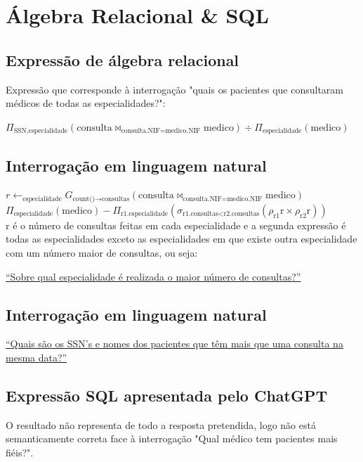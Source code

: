 \documentclass{article}
\begin{document}
\section{Álgebra Relacional \& SQL}

\subsection{Expressão de álgebra relacional}
Expressão que corresponde à interrogação "quais os pacientes que
consultaram médicos de todas as especialidades?":

\ul{$\Pi_{\text{SSN,especialidade}}(\text{consulta}\bowtie_{\text{consulta.NIF=medico.NIF}}\text{medico})\div\Pi_{\text{especialidade}}(\text{medico})$}

\subsection{Interrogação em linguagem natural}

\noindent $r\xleftarrow{}_{\text{especialidade}}G_{\text{count()}\xrightarrow{}\text{consultas}}(\text{consulta}\bowtie_{\text{consulta.NIF=medico.NIF}}\text{medico})$ \\
$\Pi_{\text{especialidade}}(\text{medico})-\Pi_{\text{r1.especialidade}}(\sigma_{\text{r1.consultas}<\text{r2.consultas}}(\rho_{\text{r1}}\text{r}\times\rho_{\text{r2}}\text{r}))$ \\

r é o número de consultas feitas em cada especialidade e a segunda expressão é todas as especialidades exceto as especialidades em que existe outra especialidade com um número maior de consultas, ou seja:

\ul{“Sobre qual especialidade é realizada o maior número de consultas?”
}


\subsection{Interrogação em linguagem natural}
\ul{“Quais são os SSN’s e nomes dos pacientes que têm mais que uma consulta na mesma data?”}


\subsection{Expressão SQL apresentada pelo ChatGPT}
O resultado não representa de todo a resposta pretendida, logo não está semanticamente correta face à interrogação "Qual  médico tem pacientes mais fiéis?".
\end{document}

